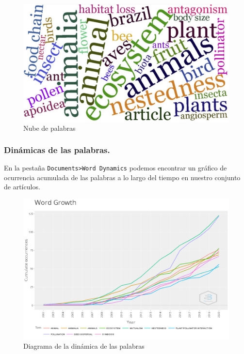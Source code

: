 \documentclass[
]{article}
\begin{document}
\begin{figure}
\centering
\includegraphics{WordCloud.JPG}
\caption{Nube de palabras}
\end{figure}

\hypertarget{dinuxe1micas-de-las-palabras.}{%
\subsubsection{Dinámicas de las
palabras.}\label{dinuxe1micas-de-las-palabras.}}

En la pestaña \texttt{Documents\textgreater{}Word\ Dynamics} podemos
encontrar un gráfico de ocurrencia acumulada de las palabras a lo largo
del tiempo en nuestro conjunto de artículos.

\begin{figure}
\centering
\includegraphics{WordGrowth.png}
\caption{Diagrama de la dinámica de las palabras}
\end{figure}
\end{document}
